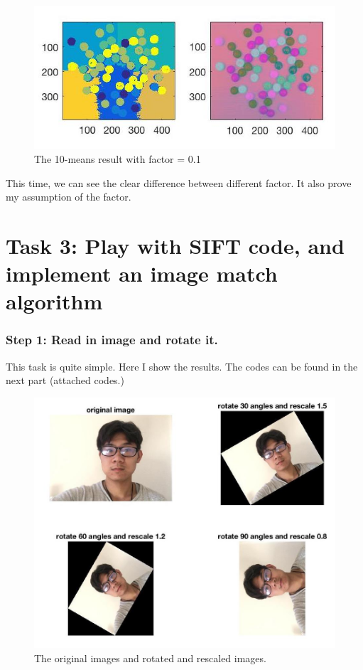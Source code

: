 \documentclass{article}
\begin{document}
\begin{figure}[htbp]
    \centering
    \includegraphics[scale = 0.4]{fig17.jpg}
    \caption{The 10-means result with factor = 0.1}
    \label{fig17}
\end{figure}

This time, we can see the clear difference between different factor. It also prove my assumption of the factor.


\section*{Task 3: Play with SIFT code, and implement an image match algorithm}

\subsubsection*{Step 1: Read in image and rotate it.}
This task is quite simple. Here I show the results. The codes can be found in the next part (attached codes.)

\begin{figure}[htbp]
    \centering
    \includegraphics[scale = 0.3]{fig18.jpg}
    \caption{The original images and rotated and rescaled images.}
    \label{fig18}
\end{figure}
\end{document}
